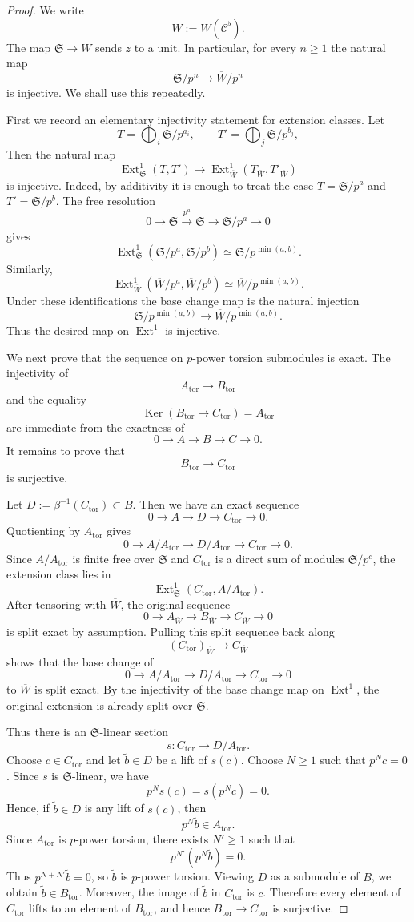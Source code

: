 \documentclass[11pt]{amsart}
\numberwithin{equation}{section}
\newcommand{\sC}{\mathcal{C}}
\newcommand{\tors}{\operatorname{tor}}
\newcommand{\mf}{\mathfrak}
\newcommand{\Ext}{\operatorname{Ext}}
\newcommand{\Ker}{\operatorname{Ker}}
\newcommand{\mS}{\mf{S}}
\numberwithin{equation}{section}
\newcommand{\ol}{\overline}
\begin{document}
\begin{proof}
We write
\[
  \ol{W}:=W(\sC^\flat).
\]
The map $\mS\to \ol{W}$ sends $z$ to a unit.  In particular, for every $n\geq 1$
the natural map
\[
  \mS/p^n\longrightarrow \ol{W}/p^n
\]
is injective.  We shall use this repeatedly.

First we record an elementary injectivity statement for extension classes.
Let
\[
  T=\bigoplus_i \mS/p^{a_i},
  \qquad
  T'=\bigoplus_j \mS/p^{b_j},
\]
Then the natural map
\[
  \Ext^1_{\mS}(T,T')
  \longrightarrow
  \Ext^1_{\ol{W}}(T_{\ol{W}},T'_{\ol{W}})
\]
is injective.  Indeed, by additivity it is enough to treat the case
$T=\mS/p^a$ and $T'=\mS/p^b$.  The free resolution
\[
  0\longrightarrow \mS
  \xrightarrow{p^a}
  \mS
  \longrightarrow
  \mS/p^a
  \longrightarrow 0
\]
gives
\[
  \Ext^1_{\mS}(\mS/p^a,\mS/p^b)
  \simeq
  \mS/p^{\min(a,b)}.
\]
Similarly,
\[
  \Ext^1_{\ol{W}}({\ol{W}}/p^a,{\ol{W}}/p^b)
  \simeq
  {\ol{W}}/p^{\min(a,b)}.
\]
Under these identifications the base change map is the natural injection
\[
  \mS/p^{\min(a,b)}
  \longrightarrow
  {\ol{W}}/p^{\min(a,b)}.
\]
Thus the desired map on $\Ext^1$ is injective.

We next prove that the sequence on $p$-power torsion submodules is exact.
The injectivity of
\[
  A_{\tors}\longrightarrow B_{\tors}
\]
and the equality
\[
  \Ker(B_{\tors}\to C_{\tors})=A_{\tors}
\]
are immediate from the exactness of
\[
  0\to A\to B\to C\to 0.
\]
It remains to prove that
\[
  B_{\tors}\longrightarrow C_{\tors}
\]
is surjective.

Let $D:=\beta^{-1}(C_{\tors})\subset B$.  Then we have an exact sequence
\[
  0\to A\to D\to C_{\tors}\to 0.
\]
Quotienting by $A_{\tors}$ gives
\[
  0\to A/A_{\tors}
  \longrightarrow
  D/A_{\tors}
  \longrightarrow
  C_{\tors}
  \to 0.
\]
Since $A/A_{\tors}$ is finite free over $\mS$ and $C_{\tors}$ is a direct
sum of modules $\mS/p^c$, the extension class lies in
\[
  \Ext^1_{\mS}(C_{\tors},A/A_{\tors}).
\]
After tensoring with ${\ol{W}}$, the original sequence
\[
  0\to A_{\ol{W}}\to B_{\ol{W}}\to C_{\ol{W}}\to 0
\]
is split exact by assumption.  Pulling this split sequence back along
\[
  (C_{\tors})_{\ol{W}}\longrightarrow C_{\ol{W}}
\]
shows that the base change of
\[
  0\to A/A_{\tors}
  \longrightarrow
  D/A_{\tors}
  \longrightarrow
  C_{\tors}
  \to 0
\]
to ${\ol{W}}$ is split exact.  By the injectivity of the base change map on
$\Ext^1$, the original extension is already split over $\mS$.

Thus there is an $\mS$-linear section
\[
  s:C_{\tors}\longrightarrow D/A_{\tors}.
\]
Choose $c\in C_{\tors}$ and let $\tilde b\in D$ be a lift of $s(c)$. Choose $N\geq 1$ such that $p^N c=0$. Since $s$ is $\mS$-linear, we have
\[
  p^N s(c)=s(p^N c)=0.
\]
Hence, if $\tilde b\in D$ is any lift of $s(c)$, then
\[
  p^N\tilde b\in A_{\tors}.
\]
Since $A_{\tors}$ is $p$-power torsion, there exists $N'\geq 1$ such that
\[
  p^{N'}(p^N\tilde b)=0.
\]
Thus $p^{N+N'}\tilde b=0$, so $\tilde b$ is $p$-power torsion. Viewing
$D$ as a submodule of $B$, we obtain $\tilde b\in B_{\tors}$. Moreover, the image of $\tilde b$ in $C_{\tors}$ is $c$. Therefore every
element of $C_{\tors}$ lifts to an element of $B_{\tors}$, and hence
$B_{\tors}\to C_{\tors}$ is surjective.


\end{proof}
\end{document}
